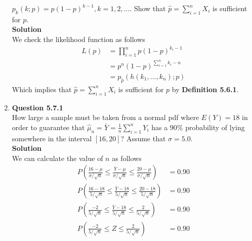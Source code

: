 \documentclass{uofa-eng-assignment}
\begin{document}
\begin{enumerate}
        $p_k(k; p) = p(1-p)^{k-1}, k = 1, 2, ...$.
        Show that $\hat{p} = \sum_{i=1}^{n} X_i$ is sufficient for $p$. \\
        \textbf{Solution} \\
        We check the likelihood function as follows
        \begin{align*}
            L(p) & = \prod_{i=1}^{n} p(1-p)^{k_i - 1}      \\
                 & = p^n (1-p)^{ \sum_{i=1} ^ {n} k_i - n} \\
                 & = p_{\hat{p}} (h(k_1, ... , k_n); p)
        \end{align*}
        Which implies that $\hat{p} = \sum_{i=1}^{n} X_i$ is sufficient for $p$ by \textbf{Definition 5.6.1}.
    \item[]
        \textbf{Question 5.7.1} \\
        How large a sample must be taken from a normal pdf where $E(Y) = 18$ in order to guarantee that
        $\hat{\mu}_n = \bar{Y} = \frac{1}{n} \sum_{i=1}^{n}Y_i$ has a $90\%$ probability of lying somewhere
        in the interval $[16, 20]$? Assume that $\sigma = 5.0$. \\
        \textbf{Solution} \\
        We can calculate the value of $n$ as follows
        \begin{align*}
            P\left(\frac{16 - \mu}{\sigma / \sqrt{n}} \leq \frac{\bar{Y} - \mu}{\sigma / \sqrt{n}} \leq \frac{20 - \mu}{\sigma / \sqrt{n}}\right) & = 0.90                     \\
            P\left(\frac{16 - 18}{5 / \sqrt{n}} \leq \frac{\bar{Y} - 18}{5 / \sqrt{n}} \leq \frac{20 - 18}{5 / \sqrt{n}}\right)                   & = 0.90                     \\
            P\left(\frac{-2}{5 / \sqrt{n}} \leq \frac{\bar{Y} - 18}{5 / \sqrt{n}} \leq \frac{2}{5 / \sqrt{n}}\right)                              & = 0.90                     \\
            P\left(\frac{-2}{5 / \sqrt{n}} \leq Z \leq \frac{2}{5 / \sqrt{n}}\right)                                                              & = 0.90                     \\

\end{align*}
\end{enumerate}
\end{document}
